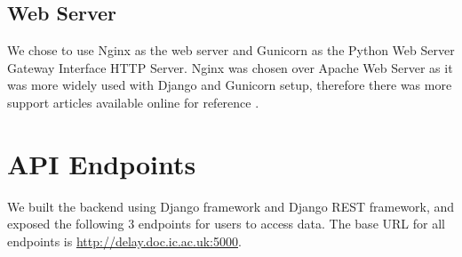 \subsection{Web Server}
\label{sec:gunicorn}
We chose to use Nginx\cite{nginx} as the web server and Gunicorn\cite{gunicorn} as the Python Web Server Gateway Interface HTTP Server. Nginx was chosen over Apache Web Server as it was more widely used with Django and Gunicorn setup, therefore there was more support articles available online for reference \cite{nginx_gunicorn_django}.

\section{API Endpoints}
\par We built the backend using Django framework and Django REST framework, and exposed the following 3 endpoints for users to access data. The base URL for all endpoints is \url{http://delay.doc.ic.ac.uk:5000}.
